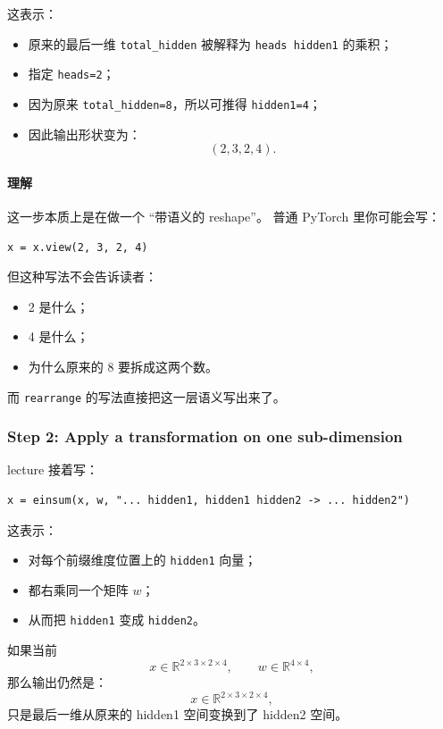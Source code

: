 \documentclass[a4paper,UTF8]{article}
\numberwithin{equation}{section}
\begin{document}
这表示：
\begin{itemize}
    \item 原来的最后一维 \verb|total_hidden| 被解释为 \verb|heads hidden1| 的乘积；
    \item 指定 \verb|heads=2|；
    \item 因为原来 \verb|total_hidden=8|，所以可推得 \verb|hidden1=4|；
    \item 因此输出形状变为：
    \[
    (2,3,2,4).
    \]
\end{itemize}

\paragraph{理解}
这一步本质上是在做一个 ``带语义的 reshape''。  
普通 PyTorch 里你可能会写：
\begin{verbatim}
x = x.view(2, 3, 2, 4)
\end{verbatim}
但这种写法不会告诉读者：
\begin{itemize}
    \item 2 是什么；
    \item 4 是什么；
    \item 为什么原来的 8 要拆成这两个数。
\end{itemize}

而 \verb|rearrange| 的写法直接把这一层语义写出来了。

\subsubsection{Step 2: Apply a transformation on one sub-dimension}

lecture 接着写：
\begin{verbatim}
x = einsum(x, w, "... hidden1, hidden1 hidden2 -> ... hidden2")
\end{verbatim}

这表示：
\begin{itemize}
    \item 对每个前缀维度位置上的 \verb|hidden1| 向量；
    \item 都右乘同一个矩阵 \(w\)；
    \item 从而把 \verb|hidden1| 变成 \verb|hidden2|。
\end{itemize}

如果当前
\[
x \in \mathbb{R}^{2 \times 3 \times 2 \times 4},\qquad
w \in \mathbb{R}^{4 \times 4},
\]
那么输出仍然是：
\[
x \in \mathbb{R}^{2 \times 3 \times 2 \times 4},
\]
只是最后一维从原来的 hidden1 空间变换到了 hidden2 空间。
\end{document}
